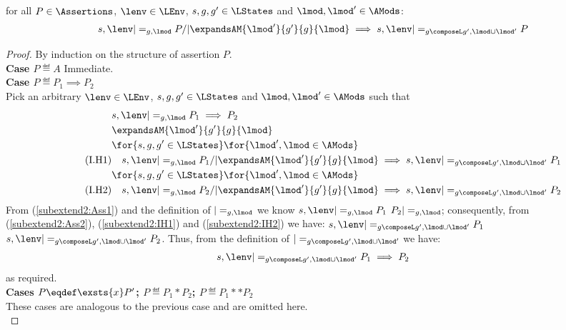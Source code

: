 %
%
\begin{lemma}[]\label{lem:sub-stable-1}
for all $P \in \Assertions$, $\lenv \in \LEnv$, $s, g, g' \in \LStates$ and $\lmod, \lmod' \in \AMods$: 
% 
\[
\begin{array}{@{} l @{}}
	s, \lenv |=_{g, \lmod} P /| 
	\expandsAM{\lmod'}{g'}{g}{\lmod}
	 \implies  s, \lenv |=_{g \composeL g', \lmod \cup \lmod'} P
\end{array}
\]
%
\begin{proof}
By induction on the structure of assertion $P$.	\\

\noindent\textbf{Case $P \eqdef A$\quad} Immediate.\\
\noindent\textbf{Case $P \eqdef P_1 \implies P_2$} \\
Pick an arbitrary $\lenv \in \LEnv$, $s, g, g' \in \LStates$ and $\lmod, \lmod' \in \AMods$ such that
%
\begin{align}
	& s, \lenv |=_{g, \lmod} P_1 \implies P_2 \label{subextend2:Ass1}\\
%	
	&\expandsAM{\lmod'}{g'}{g}{\lmod} \label{subextend2:Ass2}\\
%	
	& \for{s, g, g' \in \LStates} \for{\lmod', \lmod \in \AMods} \nonumber\\
	\tag{I.H1} & 
	\quad s, \lenv |=_{g, \lmod} P_1 /| \expandsAM{\lmod'}{g'}{g}{\lmod} \implies s, \lenv |=_{g \composeL g', \lmod \cup \lmod'} P_1 \label{subextend2:IH1}\\ 
%
	& \for{s, g, g' \in \LStates} \for{\lmod', \lmod \in \AMods} \nonumber\\
	\tag{I.H2} & 
	\quad s, \lenv |=_{g, \lmod} P_2 /| \expandsAM{\lmod'}{g'}{g}{\lmod} \implies s, \lenv |=_{g \composeL g', \lmod \cup \lmod'} P_2 \label{subextend2:IH2}
%	
\end{align}
%
From (\ref{subextend2:Ass1}) and the definition of $|=_{g, \lmod}$ we know $s, \lenv |=_{g, \lmod} P_1$  $P_2 |=_{g, \lmod}$; consequently, from (\ref{subextend2:Ass2}), (\ref{subextend2:IH1}) and (\ref{subextend2:IH2}) we have: $s, \lenv |=_{g \composeL g', \lmod \cup \lmod'} P_1$  $s, \lenv |=_{g \composeL g', \lmod \cup \lmod'} P_2$. Thus, from the definition of $|=_{g \composeL g', \lmod \cup \lmod'}$ we have:
%
\begin{align*}
	s, \lenv |=_{g \composeL g', \lmod \cup \lmod'} P_1 \implies P_2
\end{align*}
%
as required.\\

\noindent\textbf{Cases $P \eqdef \exsts{x} P'$; $P \eqdef P_1 * P_2$; $P \eqdef P_1 ** P_2$} \\
These cases are analogous to the previous case and are omitted here. \\


\end{proof}
\end{lemma}
